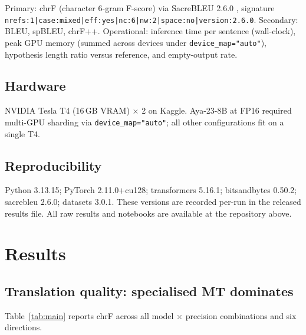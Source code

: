 \documentclass[11pt,a4paper]{article}
\begin{document}
Primary: chrF (character 6-gram F-score) via SacreBLEU 2.6.0
\cite{post2018call}, signature
\texttt{nrefs:1|case:mixed|eff:yes|nc:6|nw:2|space:no|version:2.6.0}.
Secondary: BLEU, spBLEU, chrF++. Operational: inference time per
sentence (wall-clock), peak GPU memory (summed across devices under
\texttt{device\_map="auto"}), hypothesis length ratio versus reference,
and empty-output rate.

\subsection{Hardware}

NVIDIA Tesla T4 (16\,GB VRAM) $\times$ 2 on Kaggle. Aya-23-8B at FP16
required multi-GPU sharding via \texttt{device\_map="auto"}; all other
configurations fit on a single T4.

\subsection{Reproducibility}

Python 3.13.15; PyTorch 2.11.0+cu128; transformers 5.16.1;
bitsandbytes 0.50.2; sacrebleu 2.6.0; datasets 3.0.1. These versions
are recorded per-run in the released results file. All raw results and
notebooks are available at the repository above.

\section{Results}

\subsection{Translation quality: specialised MT dominates}

Table~\ref{tab:main} reports chrF across all model $\times$ precision
combinations and six directions.
\end{document}

